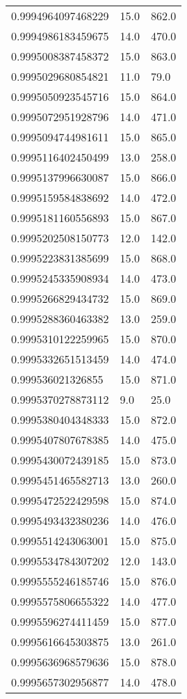 \begin{center}
\begin{supertabular}[H]{p{0.30\textwidth}p{0.05\textwidth}p{0.05\textwidth}}
0.9994964097468229 & 15.0 & 862.0 \\ 
0.9994986183459675 & 14.0 & 470.0 \\ 
0.9995008387458372 & 15.0 & 863.0 \\ 
0.9995029680854821 & 11.0 & 79.0 \\ 
0.9995050923545716 & 15.0 & 864.0 \\ 
0.9995072951928796 & 14.0 & 471.0 \\ 
0.9995094744981611 & 15.0 & 865.0 \\ 
0.9995116402450499 & 13.0 & 258.0 \\ 
0.9995137996630087 & 15.0 & 866.0 \\ 
0.9995159584838692 & 14.0 & 472.0 \\ 
0.9995181160556893 & 15.0 & 867.0 \\ 
0.9995202508150773 & 12.0 & 142.0 \\ 
0.9995223831385699 & 15.0 & 868.0 \\ 
0.9995245335908934 & 14.0 & 473.0 \\ 
0.9995266829434732 & 15.0 & 869.0 \\ 
0.9995288360463382 & 13.0 & 259.0 \\ 
0.9995310122259965 & 15.0 & 870.0 \\ 
0.9995332651513459 & 14.0 & 474.0 \\ 
0.999536021326855 & 15.0 & 871.0 \\ 
0.9995370278873112 & 9.0 & 25.0 \\ 
0.9995380404348333 & 15.0 & 872.0 \\ 
0.9995407807678385 & 14.0 & 475.0 \\ 
0.9995430072439185 & 15.0 & 873.0 \\ 
0.9995451465582713 & 13.0 & 260.0 \\ 
0.9995472522429598 & 15.0 & 874.0 \\ 
0.9995493432380236 & 14.0 & 476.0 \\ 
0.9995514243063001 & 15.0 & 875.0 \\ 
0.9995534784307202 & 12.0 & 143.0 \\ 
0.9995555246185746 & 15.0 & 876.0 \\ 
0.9995575806655322 & 14.0 & 477.0 \\ 
0.9995596274411459 & 15.0 & 877.0 \\ 
0.9995616645303875 & 13.0 & 261.0 \\ 
0.9995636968579636 & 15.0 & 878.0 \\ 
0.9995657302956877 & 14.0 & 478.0 \\ 

\end{supertabular}
\end{center}
